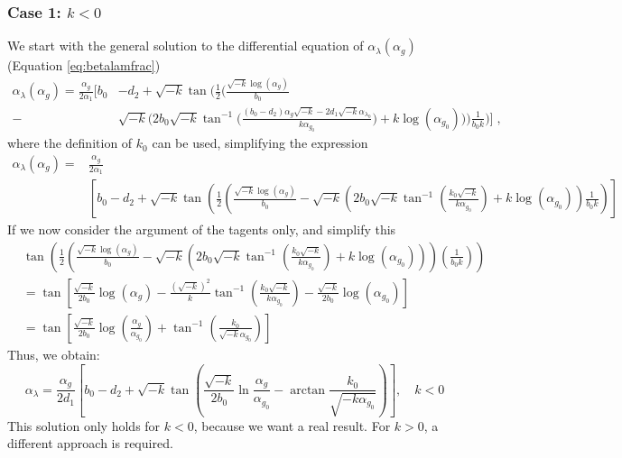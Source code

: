 \subsubsection*{Case 1: $k < 0$}
We start with the general solution to the differential equation of $\alpha_\lambda(\alpha_g)$ (Equation \ref{eq:betalamfrac})
\begin{align*}
    \alpha_{\lambda} (\alpha_{g}) = \frac{\alpha_{g}}{2\alpha_{1}}\Bigg[ b_0& - d_2 + 
    \sqrt{-k} \tan \bigg( \frac{1}{2} \bigg( \frac{\sqrt{-k} \log (\alpha_{g})}{b_0} 
    \\-&\sqrt{-k} \bigg( 2b_0 \sqrt{-k} \tan^{-1} \bigg( \frac{(b_0 - d_2) \alpha_{g} \sqrt{-k} - 2d_1 \sqrt{-k} \alpha_{\lambda_0}}{k \alpha_{g_0}} \bigg) + k \log (\alpha_{g_0}) 
    \bigg)\bigg) \frac{1}{b_0 k} \bigg) \Bigg]\;,
\end{align*}
where the definition of $k_0$ can be used, simplifying the expression
\begin{align*}
\alpha_{\lambda} (\alpha_{g}) =& \frac{\alpha_{g}}{2\alpha_{1}} \\&\left[ b_0 - d_2 + \sqrt{-k} \tan \left( \frac{1}{2} \left( \frac{\sqrt{-k} \log (\alpha_{g})}{b_0} - \sqrt{-k} \left( 2b_0 \sqrt{-k} \tan^{-1} \left( \frac{k_0 \sqrt{-k}}{k \alpha_{g_0}} \right) + k \log (\alpha_{g_0})\right)   \frac{1}{b_0 k} \right) \right. \right]
\end{align*}
If we now consider the argument of the tagents only, and simplify this
\begin{align*}
&\tan \left( \frac{1}{2} \left( \frac{\sqrt{-k} \log (\alpha_{g})}{b_0} - \sqrt{-k} \left( 2b_0 \sqrt{-k} \tan^{-1} \left( \frac{k_0 \sqrt{-k}}{k \alpha_{g_0}} \right) + k \log (\alpha_{g_0}) \right) \right)\left( \frac{1}{b_0 k} \right) \right)\\
&= \tan \left[ \frac{\sqrt{-k}}{2b_0} \log (\alpha_{g}) - \frac{(\sqrt{-k})^2}{k} \tan^{-1} \left( \frac{k_0 \sqrt{-k}}{k \alpha_{g_0}} \right) - \frac{\sqrt{-k}}{2b_0} \log (\alpha_{g_0}) \right] \\
&= \tan \left[ \frac{\sqrt{-k}}{2b_0} \log \left( \frac{\alpha_{g}}{\alpha_{g_0}} \right) + \tan^{-1} \left( \frac{k_0}{\sqrt{-k} \alpha_{g_0}} \right) \right]
\end{align*}
Thus, we obtain:
\begin{equation}
    \boxed{\alpha_{\lambda} = \frac{\alpha_{g}}{2d_{1}} \left[ b_0 - d_2 + \sqrt{-k} \tan\left( \frac{\sqrt{-k}}{2b_0} \ln\frac{\alpha_g}{\alpha_{g_0}} - \arctan\frac{k_0}{\sqrt{-k\alpha_{g_0}}} \right) \right] , \quad k<0 }
    \label{eq:alphalamk<0}
\end{equation}
This solution only holds for \( k < 0 \), because we want a real result. For \( k > 0 \), a different approach is required.


